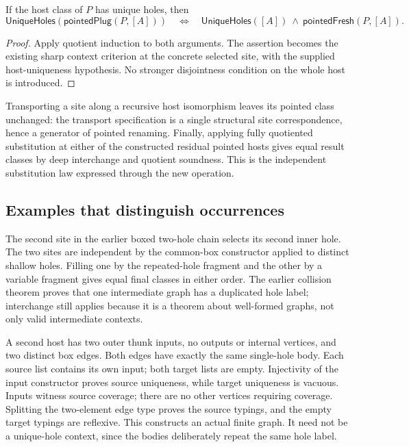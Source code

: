 \begin{theorem}
If the host class of $P$ has unique holes, then
\[
 \mathsf{UniqueHoles}(\mathsf{pointedPlug}(P,[A]))
 \quad\Longleftrightarrow\quad
 \mathsf{UniqueHoles}([A])\ \land\ \mathsf{pointedFresh}(P,[A]).
\]
\end{theorem}
\begin{proof}
Apply quotient induction to both arguments. The assertion becomes the
existing sharp context criterion at the concrete selected site, with
the supplied host-uniqueness hypothesis. No stronger disjointness
condition on the whole host is introduced.
\end{proof}

Transporting a site along a recursive host isomorphism leaves its pointed
class unchanged: the transport specification is a single structural
site correspondence, hence a generator of pointed renaming.
Finally, applying fully quotiented substitution at either of the
constructed residual pointed hosts gives equal result classes by
deep interchange and quotient soundness. This is the independent
substitution law expressed through the new operation.

\subsection{Examples that distinguish occurrences}
The second site in the earlier boxed two-hole chain selects its second
inner hole. The two sites are independent by the common-box constructor
applied to distinct shallow holes. Filling one by the repeated-hole
fragment and the other by a variable fragment gives equal final
classes in either order. The earlier collision theorem proves that one
intermediate graph has a duplicated hole label; interchange still
applies because it is a theorem about well-formed graphs, not only valid
intermediate contexts.

A second host has two outer thunk inputs, no outputs or internal
vertices, and two distinct box edges. Both edges have exactly the same
single-hole body. Each source list contains its own input; both target
lists are empty. Injectivity of the input constructor proves source
uniqueness, while target uniqueness is vacuous. Inputs witness source
coverage; there are no other vertices requiring coverage. Splitting
the two-element edge type proves the source typings, and the empty
target typings are reflexive. This constructs an actual finite graph.
It need not be a unique-hole context, since the bodies deliberately
repeat the same hole label.

